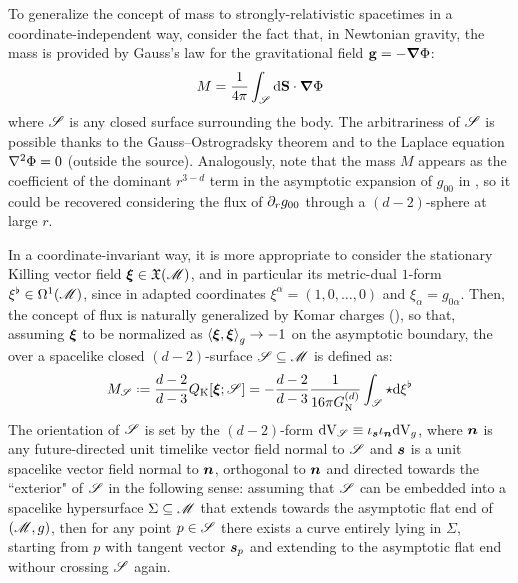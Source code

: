 To generalize the concept of mass to strongly-relativistic spacetimes in a coordinate-independent way, consider the fact that, in Newtonian gravity, the mass is provided by Gauss's law for the gravitational field $ \mathbf{g} = - \boldsymbol{\nabla} \Phi $:
\begin{equation*}
  M = \frac{1}{4\pi} \int_\mathscr{S} \mathrm{d} \mathbf{S} \cdot \boldsymbol{\nabla} \Phi
\end{equation*}
where $ \mathscr{S} $ is any closed surface surrounding the body. The arbitrariness of $ \mathscr{S} $ is possible thanks to the Gauss--Ostrogradsky theorem and to the Laplace equation $ \nabla^2 \Phi = 0 $ (outside the source). Analogously, note that the mass $ M $ appears as the coefficient of the dominant $ r^{3-d} $ term in the asymptotic expansion of $ g_{00} $ in , so it could be recovered considering the flux of $ \partial_r g_{00} $ through a $ (d-2) $-sphere at large $ r $.

In a coordinate-invariant way, it is more appropriate to consider the stationary Killing vector field $ \boldsymbol{\xi} \in \mathfrak{X}(\mathscr{M}) $, and in particular its metric-dual $ 1 $-form $ \xi^\flat \in \Omega^{1}(\mathscr{M}) $, since in adapted coordinates $ \xi^\alpha = (1 , 0 , \dots , 0) $ and $ \xi_\alpha = g_{0\alpha} $. Then, the concept of flux is naturally generalized by Komar charges (), so that, assuming $ \boldsymbol{\xi} $ to be normalized as $ \braket{\boldsymbol{\xi} , \boldsymbol{\xi}}_g \rightarrow -1 $ on the asymptotic boundary, the  over a spacelike closed $ (d-2) $-surface $ \mathscr{S} \subseteq \mathscr{M} $ is defined as:
\begin{equation}
  M_\surf \defeq \frac{d-2}{d-3} Q_\text{K}[\xib ; \surf] = - \frac{d-2}{d-3} \frac{1}{16\pi \gd} \int_\surf \star \dd \xi^\flat
  \label{eq:komar-mass}
\end{equation}
The orientation of $ \mathscr{S} $ is set by the $ (d-2) $-form $ \mathrm{d} \mathrm{V}_\mathscr{S} \equiv \iota_{\boldsymbol{s}} \iota_{\boldsymbol{n}} \mathrm{d} \mathrm{V}_g $, where $ \boldsymbol{n} $ is any future-directed unit timelike vector field normal to $ \mathscr{S} $ and $ \boldsymbol{s} $ is a unit spacelike vector field normal to $ \boldsymbol{n} $, orthogonal to $ \boldsymbol{n} $ and directed towards the ``exterior" of $ \mathscr{S} $ in the following sense: assuming that $ \mathscr{S} $ can be embedded into a spacelike hypersurface $ \Sigma \subseteq \mathscr{M} $ that extends towards the asymptotic flat end of $ (\mathscr{M} , g) $, then for any point $ p \in \mathscr{S} $ there exists a curve entirely lying in $ \Sigma $, starting from $ p $ with tangent vector $ \boldsymbol{s}_p $ and extending to the asymptotic flat end withour crossing $ \mathscr{S} $ again.


